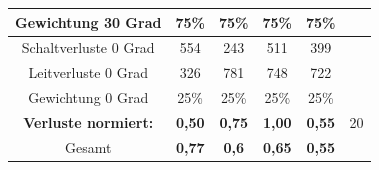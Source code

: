 \begin{table}
\begin{tabular}{|c|c|c|c|c|c|}
	\hline
	Gewichtung 30 Grad & 75\% & 75\% & 75\% & 75\% &\\
	\hline
	Schaltverluste 0 Grad & 554 & 243 & 511 & 399& \\
	\hline
	Leitverluste 0 Grad & 326 & 781 & 748 & 722&\\
	\hline
	Gewichtung 0 Grad & 25\% & 25\% & 25\% & 25\%& \\
	\hline
	\bfseries Verluste normiert: &\bfseries 0,50 &\bfseries 0,75 &\bfseries 1,00 &\bfseries 0,55 &20\\
	\hline
	Gesamt &\bfseries 0,77 &\bfseries 0,6 &\bfseries 0,65 &\bfseries 0,55& \\
	\hline
\end{tabular}
\end{table}


